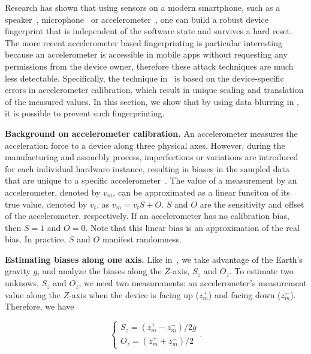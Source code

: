 Research has shown that using sensors on a modern smartphone, such as 
a speaker~\cite{das2014poster}, microphone~\cite{clarkson2012breaking} 
or accelerometer~\cite{bojinov2014mobile, dey2014accelprint}, one can 
build a robust device fingerprint that is independent of the software state
and survives a hard reset. The more recent accelerometer based fingerprinting
is particular interesting because an accelerometer is accessible in mobile apps
without requesting any permissions from the device owner, therefore these 
attack techniques are much less detectable. Specifically, the 
technique in~\cite{bojinov2014mobile} is based on the device-specific errors in 
accelerometer calibration, which result in unique scaling and translation of 
the measured values. In this section, we show that by using data blurring in 
\sysname, it is possible to prevent such fingerprinting. 


\textbf{Background on accelerometer calibration.}
An accelerometer measures the acceleration force to a device along three 
physical axes. However, during the manufacturing and assmebly process, 
imperfections or variations are introduced for each individual hardware 
instance, resulting in biases in the sampled data that are unique to a specific
accelerometer~\cite{doscher1998accelerometer}. The value of a measurement
by an accelerometer, denoted by $v_m$, can be approximated as a linear 
funciton of its true value, denoted by $v_t$, as $v_m=v_tS+O$. $S$ and $O$
are the sensitivity and offset of the accelerometer, respectively. If an 
accelerometer has no calibration bias, then $S=1$ and $O=0$. Note that
this linear bias is an approximation of the real bias. In practice, $S$ and $O$
manifest randomness.

\textbf{Estimating biases along one axis.}
Like in~\cite{bojinov2014mobile}, we take advantage of the Earth's gravity
$g$, and analyze the biases along the $Z$-axis, $S_z$ and $O_z$. To 
estimate two unknows, $S_z$ and $O_z$, we need two measurements: an
accelerometer's measurement value along the $Z$-axis when the device is 
facing up ($z_m^+$) and facing down ($z_m^-$). Therefore, we have

\begin{equation}\label{eq:fxy}
\left\{
    \begin{array}{c}
      S_z = (z_m^+ - z_m^-)/2g \\
      O_z = (z_m^+ + z_m^-)/2
    \end{array}
  \right..
\end{equation}

